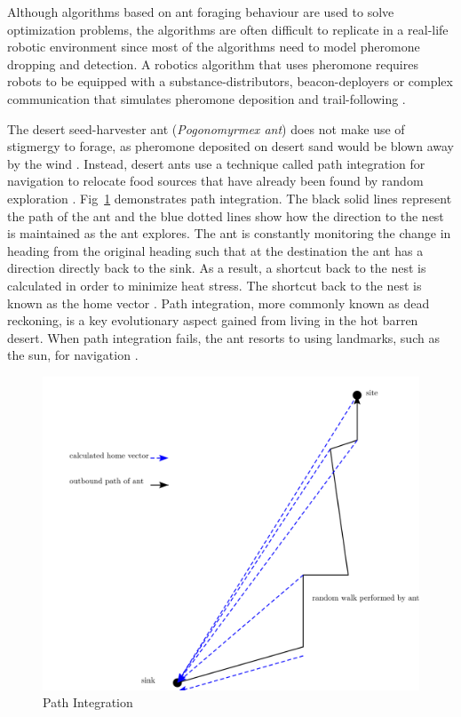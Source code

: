 Although algorithms based on ant foraging behaviour are used to solve optimization problems, the algorithms are often difficult to replicate in a real-life robotic environment since most of the algorithms need to model pheromone dropping and detection. A robotics algorithm that uses pheromone requires robots to be equipped with a substance-distributors, beacon-deployers or complex communication that simulates pheromone deposition and trail-following \cite{hoff2010two}.

The desert seed-harvester ant (\textit{Pogonomyrmex ant}) does not make use of stigmergy to forage, as pheromone deposited on desert sand would be blown away by the wind \cite{collett1992visual,hecker2015beyond}. Instead, desert ants use a technique called path integration for navigation to relocate food sources that have already been found by random exploration \cite{collett1998local,wehner2003desert}. Fig~\ref{pathintegration} demonstrates path integration. The black solid lines represent the path of the ant and the blue dotted lines show how the direction to the nest is maintained as the ant explores. The ant is constantly monitoring the change in heading from the original heading such that at the destination the ant has a direction directly back to the sink. As a result, a shortcut back to the nest is calculated in order to minimize heat stress. The shortcut back to the nest is known as the home vector \cite{muller1988path}. Path integration, more commonly known as dead reckoning, is a key evolutionary aspect gained from living in the hot barren desert. When path integration fails, the ant resorts to using landmarks, such as the sun, for navigation \cite{collett1998local}.

\begin{figure} [h]
	\centering
	\includegraphics[width=\textwidth]{chapters/chapter2/figures/drawing.png}
	\caption{Path Integration}
	\label{pathintegration}
\end{figure}

